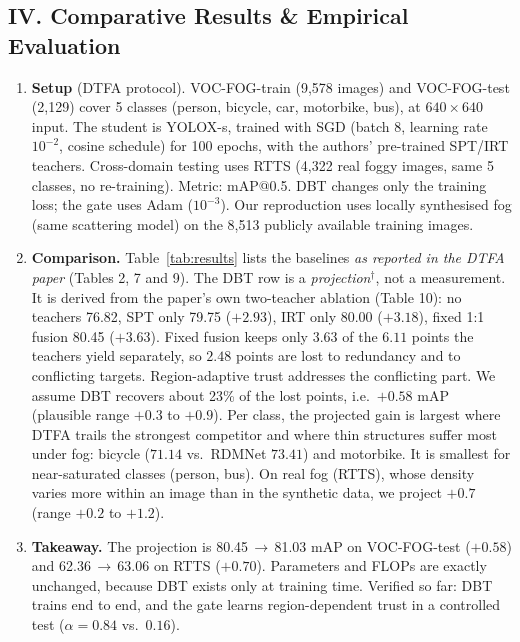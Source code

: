 \documentclass[8pt,a4paper]{article}
\begin{document}
\subsection*{IV. Comparative Results \& Empirical Evaluation}
\begin{enumerate}
    \item \textbf{Setup} (DTFA protocol). VOC-FOG-train (9{,}578 images) and VOC-FOG-test (2{,}129) cover 5 classes (person, bicycle, car, motorbike, bus), at $640{\times}640$ input. The student is YOLOX-s, trained with SGD (batch 8, learning rate $10^{-2}$, cosine schedule) for 100 epochs, with the authors' pre-trained SPT/IRT teachers. Cross-domain testing uses RTTS (4{,}322 real foggy images, same 5 classes, no re-training). Metric: mAP@0.5. DBT changes only the training loss; the gate uses Adam ($10^{-3}$). Our reproduction uses locally synthesised fog (same scattering model) on the 8{,}513 publicly available training images.
    \item \textbf{Comparison.} Table~\ref{tab:results} lists the baselines \emph{as reported in the DTFA paper} (Tables 2, 7 and 9). The DBT row is a \emph{projection}$^\dagger$, not a measurement. It is derived from the paper's own two-teacher ablation (Table 10): no teachers 76.82, SPT only 79.75 ($+2.93$), IRT only 80.00 ($+3.18$), fixed 1:1 fusion 80.45 ($+3.63$). Fixed fusion keeps only $3.63$ of the $6.11$ points the teachers yield separately, so $2.48$ points are lost to redundancy and to conflicting targets. Region-adaptive trust addresses the conflicting part. We assume DBT recovers about 23\% of the lost points, i.e.\ $+0.58$ mAP (plausible range $+0.3$ to $+0.9$). Per class, the projected gain is largest where DTFA trails the strongest competitor and where thin structures suffer most under fog: bicycle ($71.14$ vs.\ RDMNet $73.41$) and motorbike. It is smallest for near-saturated classes (person, bus). On real fog (RTTS), whose density varies more within an image than in the synthetic data, we project $+0.7$ (range $+0.2$ to $+1.2$).
    \item \textbf{Takeaway.} The projection is 80.45\,$\rightarrow$\,81.03 mAP on VOC-FOG-test ($+0.58$) and 62.36\,$\rightarrow$\,63.06 on RTTS ($+0.70$). Parameters and FLOPs are exactly unchanged, because DBT exists only at training time. Verified so far: DBT trains end to end, and the gate learns region-dependent trust in a controlled test ($\alpha=0.84$ vs.\ $0.16$).
\end{enumerate}
\end{document}
